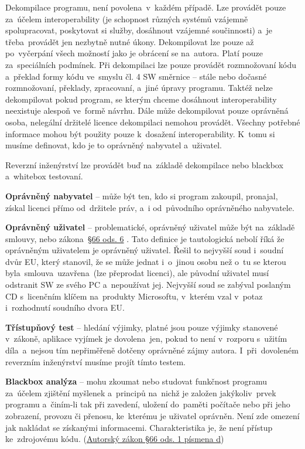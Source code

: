 Dekompilace programu, není povolena~v~každém případě. Lze provádět pouze za~účelem interoperability (je schopnost různých systémů vzájemně spolupracovat, poskytovat si služby, dosáhnout vzájemné součinnosti) a~je třeba~provádět jen nezbytně nutné úkony. Dekompilovat lze pouze až po~vyčerpání všech možností jako je obrácení se na~autora. Platí pouze za~speciálních podmínek. Při dekompilaci lze pouze provádět rozmnožovaní kódu a~překlad formy kódu ve~smyslu čl. 4 SW směrnice -- stále nebo dočasné rozmnožovaní, překlady, zpracovaní, a~jiné úpravy programu. Taktéž nelze dekompilovat pokud program, se kterým chceme dosáhnout interoperability neexistuje alespoň ve~formě návrhu. Dále může dekompilovat pouze oprávněná osoba, nelegální držitelé licence dekompilaci nemohou provádět. Všechny potřebné informace mohou být použity pouze k~dosažení interoperability. K~tomu si musíme definovat, kdo je to oprávněný nabyvatel a~uživatel.

Reverzní inženýrství lze provádět buď na~základě dekompilace nebo blackbox a~whitebox testovaní.

\textbf{Oprávněný nabyvatel} -- může být ten, kdo si program zakoupil, pronajal, získal licenci přímo od~držitele práv, a~i od~původního oprávněného nabyvatele.

\textbf{Oprávněný uživatel} -- problematické, oprávněný uživatel může být na~základě smlouvy, nebo zákona~\href{https://www.zakonyprolidi.cz/cs/2000-121#p66-6}{§66 ods. 6} \emph{}. Tato definice je tautologická nebolí říká že oprávněným uživatelem je oprávněný uživatel. Řešil to nejvyšší soud i~soudní dvůr EU, který stanovil, že se může jednat i~o~jinou osobu než o~tu se kterou byla~smlouva~uzavřena~(lze přeprodat licenci), ale původní uživatel musí odstranit SW ze svého PC a~nepoužívat jej. Nejvyšší soud se zabýval poslaným CD s~licenčním klíčem na~produkty Microsoftu, v~kterém vzal v~potaz i~rozhodnutí soudního dvora EU.

\textbf{Třístupňový test} -- hledání výjimky, platné jsou pouze výjimky stanovené v~zákoně, aplikace vyjímek je dovolena~jen, pokud to není v~rozporu s~užitím díla~a~nejsou tím nepřiměřeně dotčeny oprávněné zájmy autora. I~při~dovoleném reverzním inženýrství musíme projít tímto testem.

\textbf{Blackbox analýza} -- mohu zkoumat nebo studovat funkčnost programu za~účelem zjištění myšlenek a~principů na~nichž je založen jakýkoliv~prvek programu a~činím-li tak při zavedení, uložení do~paměti počítače nebo při jeho zobrazení, provozu či přenosu, ke~kterému je uživatel oprávněn. Není zde omezení jak nakládat se získanými informacemi. Charakteristika je, že není přístup ke~zdrojovému kódu. (\href{https://www.zakonyprolidi.cz/cs/2000-121#p66-1-d}{Autorský zákon §66 ods. 1 písmena d})

